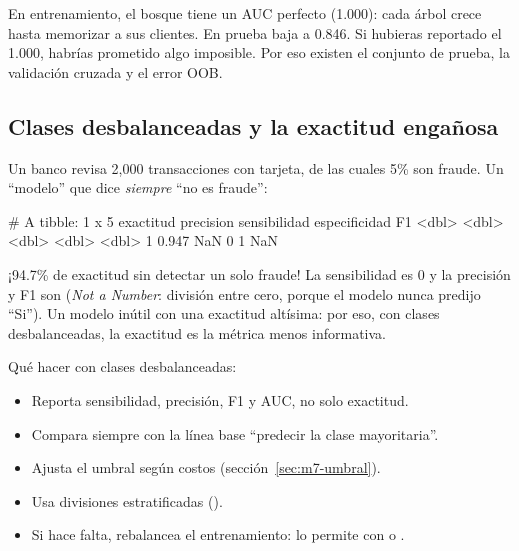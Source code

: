 En entrenamiento, el bosque tiene un AUC perfecto (1.000): cada árbol crece
hasta memorizar a sus clientes. En prueba baja a 0.846. Si hubieras reportado
el 1.000, habrías prometido algo imposible. Por eso existen el conjunto de
prueba, la validación cruzada y el error OOB.

\subsection{Clases desbalanceadas y la exactitud engañosa}

Un banco revisa 2{,}000 transacciones con tarjeta, de las cuales 5\% son
fraude. Un ``modelo'' que dice \emph{siempre} ``no es fraude'':


\begin{rsalida}
# A tibble: 1 x 5
  exactitud precision sensibilidad especificidad    F1
      <dbl>     <dbl>        <dbl>         <dbl> <dbl>
1     0.947       NaN            0             1   NaN
\end{rsalida}

¡94.7\% de exactitud sin detectar un solo fraude! La sensibilidad es 0 y la
precisión y F1 son  (\emph{Not a Number}: división entre cero,
porque el modelo nunca predijo ``Si''). Un modelo inútil con una exactitud
altísima: por eso, con clases desbalanceadas, la exactitud es la métrica menos
informativa.

Qué hacer con clases desbalanceadas:

\begin{itemize}
  \item Reporta sensibilidad, precisión, F1 y AUC, no solo exactitud.
  \item Compara siempre con la línea base ``predecir la clase mayoritaria''.
  \item Ajusta el umbral según costos (sección~\ref{sec:m7-umbral}).
  \item Usa divisiones estratificadas ().
  \item Si hace falta, rebalancea el entrenamiento:  lo permite
        con  o .
\end{itemize}


